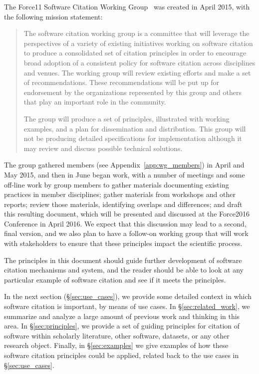 \documentclass[11pt, oneside]{amsart}
\begin{document}
The Force11 Software Citation Working Group~\cite{f11scwg} was created in April 2015, with the following mission statement:

\begin{quote}
The software citation working group is a committee that will leverage the perspectives of a variety of existing initiatives working on software citation to produce a consolidated set of citation principles in order to encourage broad adoption of a consistent policy for software citation across disciplines and venues. The working group will review existing efforts and make a set of recommendations. These recommendations will be put up for endorsement by the organizations represented by this group and others that play an important role in the community.

The group will produce a set of principles, illustrated with working examples, and a plan for dissemination and distribution. This group will not be producing detailed specifications for implementation although it may review and discuss possible technical solutions.\end{quote}

The group gathered members (see Appendix~\ref{app:wg_members}) in April and May 2015, and then in June began work, with a number of meetings
and some off-line work by group members to gather materials documenting existing
practices in member disciplines; gather materials from workshops and other reports;
review those materials, identifying overlaps and differences; and draft this resulting document,
which will be presented and discussed at the Force2016 Conference \cite{force2016}
in April 2016.  We expect that
this discussion may lead to a second, final version, and we also
plan to have a follow-on working group that will work with stakeholders to ensure that
these principles impact the scientific process.

The principles in this document should guide further development of software citation mechanisms and system, and the reader should be able to look at any particular example of software citation and see if it meets the principles.

In the next section (\S\ref{sec:use_cases}), we provide some detailed context in which
software citation is important, by means of use cases.  In \S\ref{sec:related_work}, we
summarize and analyze a large amount of previous work and thinking in this area.  In
\S\ref{sec:principles}, we provide a set of guiding principles for citation of software within
scholarly literature, other software, datasets, or any other research object.  Finally,
in \S\ref{sec:examples} we give examples of how these software citation principles
could be applied, related back to the use cases in \S\ref{sec:use_cases}.
\end{document}
